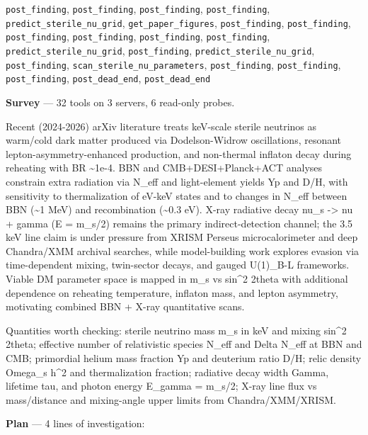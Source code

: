 \documentclass[11pt,a4paper]{article}
\begin{document}
\texttt{post\_finding}, \texttt{post\_finding}, \texttt{post\_finding}, \texttt{post\_finding}, \texttt{predict\_sterile\_nu\_grid}, \texttt{get\_paper\_figures}, \texttt{post\_finding}, \texttt{post\_finding}, \texttt{post\_finding}, \texttt{post\_finding}, \texttt{post\_finding}, \texttt{post\_finding}, \texttt{predict\_sterile\_nu\_grid}, \texttt{post\_finding}, \texttt{predict\_sterile\_nu\_grid}, \texttt{post\_finding}, \texttt{scan\_sterile\_nu\_parameters}, \texttt{post\_finding}, \texttt{post\_finding}, \texttt{post\_finding}, \texttt{post\_dead\_end}, \texttt{post\_dead\_end}\par
\textbf{Survey} --- 32 tools on 3 servers, 6 read-only probes.

Recent (2024-2026) arXiv literature treats keV-scale sterile neutrinos as warm/cold dark matter produced via Dodelson-Widrow oscillations, resonant lepton-asymmetry-enhanced production, and non-thermal inflaton decay during reheating with BR \textasciitilde{}1e-4. BBN and CMB+DESI+Planck+ACT analyses constrain extra radiation via N\_eff and light-element yields Yp and D/H, with sensitivity to thermalization of eV-keV states and to changes in N\_eff between BBN (\textasciitilde{}1 MeV) and recombination (\textasciitilde{}0.3 eV). X-ray radiative decay nu\_s -\textgreater{} nu + gamma (E = m\_s/2) remains the primary indirect-detection channel; the 3.5 keV line claim is under pressure from XRISM Perseus microcalorimeter and deep Chandra/XMM archival searches, while model-building work explores evasion via time-dependent mixing, twin-sector decays, and gauged U(1)\_B-L frameworks. Viable DM parameter space is mapped in m\_s vs sin\textasciicircum{}2 2theta with additional dependence on reheating temperature, inflaton mass, and lepton asymmetry, motivating combined BBN + X-ray quantitative scans.

Quantities worth checking: sterile neutrino mass m\_s in keV and mixing sin\textasciicircum{}2 2theta; effective number of relativistic species N\_eff and Delta N\_eff at BBN and CMB; primordial helium mass fraction Yp and deuterium ratio D/H; relic density Omega\_s h\textasciicircum{}2 and thermalization fraction; radiative decay width Gamma, lifetime tau, and photon energy E\_gamma = m\_s/2; X-ray line flux vs mass/distance and mixing-angle upper limits from Chandra/XMM/XRISM.

\textbf{Plan} --- 4 lines of investigation:
\end{document}

